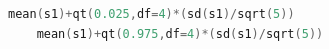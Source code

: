 \begin{lstlisting}[language=c++,label={code:20_06},caption={When the population variance is unknown}]
    mean(s1)+qt(0.025,df=4)*(sd(s1)/sqrt(5))
    mean(s1)+qt(0.975,df=4)*(sd(s1)/sqrt(5))
\end{lstlisting}
